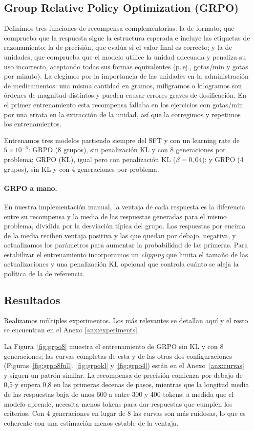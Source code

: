 \subsection{Group Relative Policy Optimization (GRPO)}
Definimos tres funciones de recompensa complementarias: la de formato, que comprueba que la respuesta sigue la estructura esperada e incluye las etiquetas de razonamiento; la de precisión, que evalúa si el valor final es correcto; y la de unidades, que comprueba que el modelo utilice la unidad adecuada y penaliza su uso incorrecto, aceptando todas sus formas equivalentes (p.\,ej., gotas/min y gotas por minuto). La elegimos por la importancia de las unidades en la administración de medicamentos: una misma cantidad en gramos, miligramos o kilogramos son órdenes de magnitud distintos y pueden causar errores graves de dosificación. En el primer entrenamiento esta recompensa fallaba en los ejercicios con gotas/min por una errata en la extracción de la unidad, así que la corregimos y repetimos los entrenamientos.

Entrenamos tres modelos partiendo siempre del SFT y con un learning rate de $5 \times 10^{-6}$: GRPO (8 grupos), sin penalización KL y con 8 generaciones por problema; GRPO (KL), igual pero con penalización KL ($\beta = 0{,}04$); y GRPO (4 grupos), sin KL y con 4 generaciones por problema.

\paragraph{GRPO a mano.}
En nuestra implementación manual, la ventaja de cada respuesta es la diferencia entre su recompensa y la media de las respuestas generadas para el mismo problema, dividida por la desviación típica del grupo. Las respuestas por encima de la media reciben ventaja positiva y las que quedan por debajo, negativa, y actualizamos los parámetros para aumentar la probabilidad de las primeras. Para estabilizar el entrenamiento incorporamos un \textit{clipping} que limita el tamaño de las actualizaciones y una penalización KL opcional que controla cuánto se aleja la política de la de referencia.

\subsection{Resultados}
Realizamos múltiples experimentos. Los más relevantes se detallan aquí y el resto se encuentran en el Anexo \ref{anx:experiments}.

La Figura~\ref{fig:grpo8} muestra el entrenamiento de GRPO sin KL y con 8 generaciones; las curvas completas de esta y de las otras dos configuraciones (Figuras~\ref{fig:grpo8full}, \ref{fig:grpokl} y~\ref{fig:grpo4}) están en el Anexo~\ref{anx:curvas} y siguen un patrón similar. La recompensa de precisión comienza por debajo de 0,5 y supera 0,8 en las primeras decenas de pasos, mientras que la longitud media de las respuestas baja de unos 600 a entre 300 y 400 tokens: a medida que el modelo aprende, necesita menos tokens para dar respuestas que cumplen los criterios. Con 4 generaciones en lugar de 8 las curvas son más ruidosas, lo que es coherente con una estimación menos estable de la ventaja.


